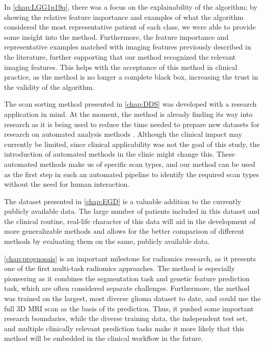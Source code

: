 In \cref{chap:LGG1p19q}, there was a focus on the explainability of the algorithm; by showing the relative feature importance and examples of what the algorithm considered the most representative patient of each class, we were able to provide some insight into the method.
Furthermore, the feature importance and representative examples matched with imaging features previously described in the literature, further supporting that our method recognized the relevant imaging features.
This helps with the acceptance of this method in clinical practice, as the method is no longer a complete black box, increasing the trust in the validity of the algorithm.

The scan sorting method presented in \cref{chap:DDS} was developed with a research application in mind.
At the moment, the method is already finding its way into research as it is being used to reduce the time needed to prepare new datasets for research on automated analysis methods \autocite{garderen2020automaticanalysis}.
Although the clinical impact may currently be limited, since clinical applicability was not the goal of this study, the introduction of automated methods in the clinic might change this.
These automated methods make us of specific scan types, and our method can be used as the first step in such an automated pipeline to identify the required scan types without the need for human interaction.

The dataset presented in \cref{chap:EGD} is a valuable addition to the currently publicly available data.
The large number of patients included in this dataset and the clinical routine, real-life character of this data will aid in the development of more generalizable methods and allows for the better comparison of different methods by evaluating them on the same, publicly available data.

\cref{chap:prognosais} is an important milestone for radiomics research, as it presents one of the first multi-task radiomics approaches.
The method is especially pioneering as it combines the segmentation task and genetic feature prediction task, which are often considered separate challenges.
Furthermore, the method was trained on the largest, most diverse glioma dataset to date, and could use the full 3D \gls{MRI} scan as the basis of its prediction.
Thus, it pushed some important research boundaries, while the diverse training data, the independent test set, and multiple clinically relevant prediction tasks make it more likely that this method will be embedded in the clinical workflow in the future.


